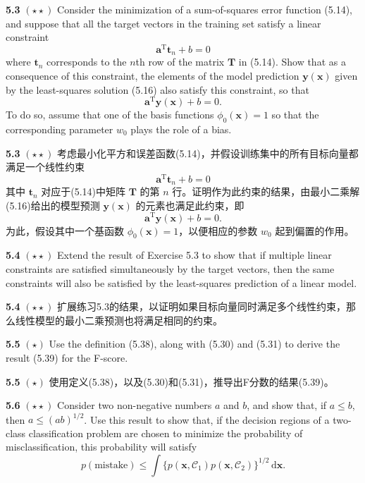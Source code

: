 \documentclass{article}
\begin{document}
\textbf{5.3} $(\star\star)$ Consider the minimization of a sum-of-squares error function (5.14), and suppose that all the target vectors in the training set satisfy a linear constraint
\begin{equation}
\mathbf{a}^{\mathrm{T}}\mathbf{t}_n + b = 0 \tag{5.97}
\end{equation}
where $\mathbf{t}_n$ corresponds to the $n$th row of the matrix $\mathbf{T}$ in (5.14). Show that as a consequence of this constraint, the elements of the model prediction $\mathbf{y}(\mathbf{x})$ given by the least-squares solution (5.16) also satisfy this constraint, so that
\begin{equation}
\mathbf{a}^{\mathrm{T}}\mathbf{y}(\mathbf{x}) + b = 0. \tag{5.98}
\end{equation}
To do so, assume that one of the basis functions $\phi_0(\mathbf{x}) = 1$ so that the corresponding parameter $w_0$ plays the role of a bias.

\textbf{5.3} $(\star\star)$ 考虑最小化平方和误差函数(5.14)，并假设训练集中的所有目标向量都满足一个线性约束
\begin{equation}
\mathbf{a}^{\mathrm{T}}\mathbf{t}_n + b = 0 \tag{5.97}
\end{equation}
其中 $\mathbf{t}_n$ 对应于(5.14)中矩阵 $\mathbf{T}$ 的第 $n$ 行。证明作为此约束的结果，由最小二乘解(5.16)给出的模型预测 $\mathbf{y}(\mathbf{x})$ 的元素也满足此约束，即
\begin{equation}
\mathbf{a}^{\mathrm{T}}\mathbf{y}(\mathbf{x}) + b = 0. \tag{5.98}
\end{equation}
为此，假设其中一个基函数 $\phi_0(\mathbf{x}) = 1$，以便相应的参数 $w_0$ 起到偏置的作用。


\textbf{5.4} $(\star\star)$ Extend the result of Exercise 5.3 to show that if multiple linear constraints are satisfied simultaneously by the target vectors, then the same constraints will also be satisfied by the least-squares prediction of a linear model.

\textbf{5.4} $(\star\star)$ 扩展练习5.3的结果，以证明如果目标向量同时满足多个线性约束，那么线性模型的最小二乘预测也将满足相同的约束。


\textbf{5.5} $(\star)$ Use the definition (5.38), along with (5.30) and (5.31) to derive the result (5.39) for the F-score.

\textbf{5.5} $(\star)$ 使用定义(5.38)，以及(5.30)和(5.31)，推导出F分数的结果(5.39)。


\textbf{5.6} $(\star\star)$ Consider two non-negative numbers $a$ and $b$, and show that, if $a \leqslant b$, then $a \leqslant (ab)^{1/2}$. Use this result to show that, if the decision regions of a two-class classification problem are chosen to minimize the probability of misclassification, this probability will satisfy
\begin{equation}
p(\text{mistake}) \leqslant \int \{p(\mathbf{x}, \mathcal{C}_1)p(\mathbf{x}, \mathcal{C}_2)\}^{1/2} \,\mathrm{d}\mathbf{x}. \tag{5.99}
\end{equation}
\end{document}
